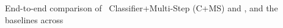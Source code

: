 \begin{table}[!ht]
\DIFdelendFL \DIFaddbeginFL \resizebox{\columnwidth}{!}{%
  
  }\DIFaddendFL %
\caption{End-to-end comparison of \system\ \DIFdelbeginFL {}\DIFdelendFL \DIFaddbeginFL {}\DIFaddendFL Classifier+Multi-Step (C+MS) \DIFdelbeginFL {}\DIFdelendFL and \DIFdelbeginFL {}\DIFdelendFL \DIFaddbeginFL {}\DIFaddendFL , and the baselines across \DIFdelbeginFL {}}
\end{table}
